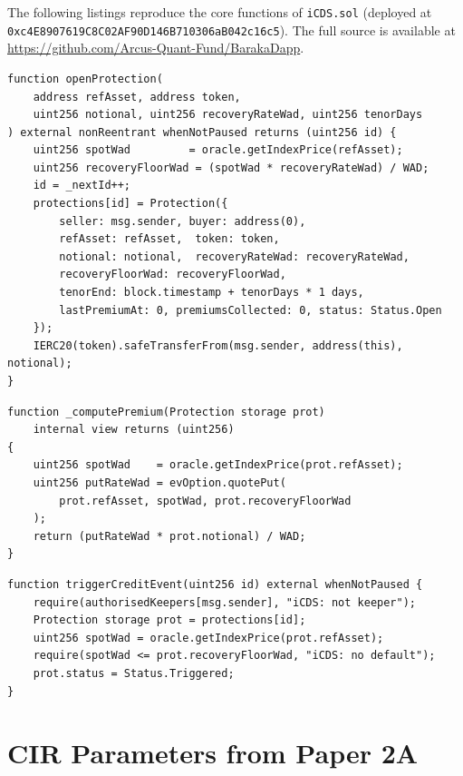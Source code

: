\documentclass[12pt]{article}
\theoremstyle{plain}
\theoremstyle{definition}
\theoremstyle{remark}
\begin{document}
The following listings reproduce the core functions of \texttt{iCDS.sol}
(deployed at \texttt{0xc4E8907619C8C02AF90D146B710306aB042c16c5}).
The full source is available at
\url{https://github.com/Arcus-Quant-Fund/BarakaDapp}.

\begin{lstlisting}[caption={openProtection: seller deposits notional as collateral}]
function openProtection(
    address refAsset, address token,
    uint256 notional, uint256 recoveryRateWad, uint256 tenorDays
) external nonReentrant whenNotPaused returns (uint256 id) {
    uint256 spotWad         = oracle.getIndexPrice(refAsset);
    uint256 recoveryFloorWad = (spotWad * recoveryRateWad) / WAD;
    id = _nextId++;
    protections[id] = Protection({
        seller: msg.sender, buyer: address(0),
        refAsset: refAsset,  token: token,
        notional: notional,  recoveryRateWad: recoveryRateWad,
        recoveryFloorWad: recoveryFloorWad,
        tenorEnd: block.timestamp + tenorDays * 1 days,
        lastPremiumAt: 0, premiumsCollected: 0, status: Status.Open
    });
    IERC20(token).safeTransferFrom(msg.sender, address(this), notional);
}
\end{lstlisting}

\begin{lstlisting}[caption={\_computePremium: put-option-priced premium at iota=0}]
function _computePremium(Protection storage prot)
    internal view returns (uint256)
{
    uint256 spotWad    = oracle.getIndexPrice(prot.refAsset);
    uint256 putRateWad = evOption.quotePut(
        prot.refAsset, spotWad, prot.recoveryFloorWad
    );
    return (putRateWad * prot.notional) / WAD;
}
\end{lstlisting}

\begin{lstlisting}[caption={triggerCreditEvent: on-chain oracle credit event}]
function triggerCreditEvent(uint256 id) external whenNotPaused {
    require(authorisedKeepers[msg.sender], "iCDS: not keeper");
    Protection storage prot = protections[id];
    uint256 spotWad = oracle.getIndexPrice(prot.refAsset);
    require(spotWad <= prot.recoveryFloorWad, "iCDS: no default");
    prot.status = Status.Triggered;
}
\end{lstlisting}

\section{CIR Parameters from Paper 2A}
\label{app:cir}
\end{document}
